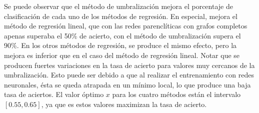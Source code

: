 Se puede observar que el método de umbralización mejora el porcentaje de clasificación de cada uno de los métodos de regresión. En especial, mejora el método de regresión lineal, que con las redes parenclíticas con grafos completos apenas superaba el 50\% de acierto, con el método de umbralización supera el 90\%. En los otros métodos de regresión, se produce el mismo efecto, pero la mejora es inferior que en el caso del método de regresión lineal. Notar que se producen fuertes variaciones en la tasa de acierto para valores muy cercanos de la umbralización. Esto puede ser debido a que al realizar el entrenamiento con redes neuronales, ésta se queda atrapada en un mínimo local, lo que produce una baja tasa de aciertos. El valor óptimo $x$ para los cuatro métodos están el intervalo $[0.55, 0.65]$, ya que es estos valores maximizan la tasa de acierto.\\
